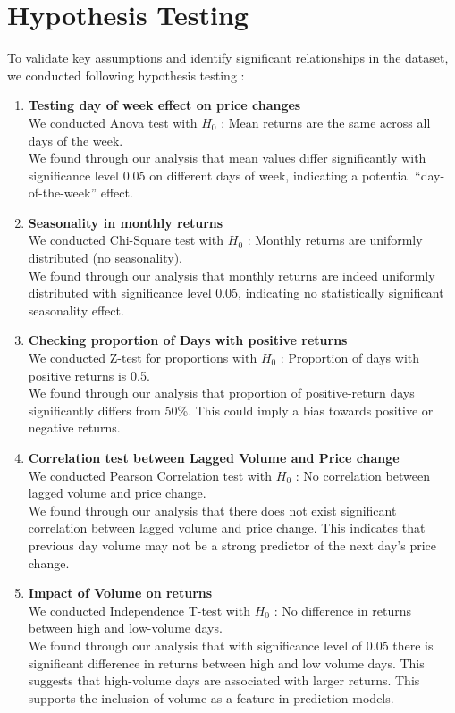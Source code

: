 \documentclass[conference]{IEEEtran}
\begin{document}
\section{Hypothesis Testing}
To validate key assumptions and identify significant relationships in the dataset, we conducted following hypothesis testing :
\begin{enumerate}
\item \textbf{Testing day of week effect on price changes}\\
    We conducted Anova test with \(H_{0}\) : Mean returns are the same across all days of the week.
    \\
    We found through our analysis that mean values differ significantly with significance level 0.05 on different days of week, indicating a potential “day-of-the-week” effect.
\item \textbf{Seasonality in monthly returns}\\
    We conducted Chi-Square test with \(H_{0}\) : Monthly returns are uniformly distributed (no seasonality).
    \\
    We found through our analysis that monthly returns are indeed uniformly distributed with significance level 0.05, indicating no statistically significant seasonality effect.
\item \textbf{Checking proportion of Days with positive returns}\\
    We conducted Z-test for proportions with \(H_{0}\) : Proportion of days with positive returns is 0.5.
    \\
    We found through our analysis that proportion of positive-return days significantly differs from 50\%. This could imply a bias towards positive or negative returns.
\item \textbf{Correlation test between Lagged Volume and Price change}\\
    We conducted Pearson Correlation test with \(H_{0}\) : No correlation between lagged volume and price change.
    \\
    We found through our analysis that there does not exist significant correlation between lagged volume and price change. This indicates that previous day volume may not be a strong predictor of the next day’s price change.
\item \textbf{Impact of Volume on returns}\\
    We conducted Independence T-test with \(H_{0}\) : No difference in returns between high and low-volume days.
    \\
    We found through our analysis that with significance level of 0.05 there is significant difference in returns between high and low volume days. This suggests that high-volume days are associated with larger returns. This supports the inclusion of volume as a feature in prediction models.

\end{enumerate}
\end{document}

